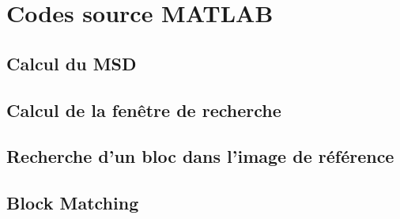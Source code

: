 \documentclass[a4paper, 12pt]{article}
\newcommand{\FSource}[1]{%

}
\begin{document}
\clearpage

%
%
\appendix

\section{Codes source MATLAB}

\subsection{Calcul du MSD}\label{msd_code}

\FSource{../compute_msd.m}

\newpage

\subsection{Calcul de la fenêtre de recherche}\label{search_window}

\FSource{../search_window.m}

\newpage

\subsection{Recherche d'un bloc dans l'image de référence}\label{block_search}

\FSource{../block_matching.m}

\newpage

\subsection{Block Matching}\label{block_matching}

\FSource{../block_matching_encode.m}
\end{document}
